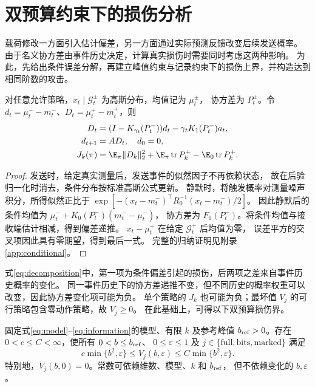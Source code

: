 \section{双预算约束下的损伤分析}
\label{sec:bounds}
载荷修改一方面引入估计偏差，另一方面通过实际预测反馈改变后续发送概率。
由于名义协方差由事件历史决定，计算真实损伤时需要同时考虑这两种影响。
为此，先给出条件误差分解，再建立峰值约束与记录约束下的损伤上界，并构造达到相同阶数的攻击。
\begin{lemma}[条件误差分解]
\label{lem:gaussian}
对任意允许策略，$x_t\mid\mathcal G_t^\pm$ 为高斯分布，均值记为 $\mu_t^\pm$，
协方差为 $P_t^\pm$。令 $d_t=\mu_t^--m_t^-$、$D_t=\mu_t^+-m_t^+$，则
\begin{equation}
 \begin{aligned}
 D_t&=(I-K_{\gamma_t}(P_t^-))d_t-\gamma_t K_1(P_t^-)a_t,\\
 d_{t+1}&=AD_t,\quad d_0=0,\\
 J_k(\pi)&=\E_\pi\|D_k\|_2^2+
 \E_\pi\operatorname{tr}P_k^+-\E_0\operatorname{tr}P_k^+.
 \end{aligned}
 \label{eq:decomposition}
\end{equation}
\end{lemma}
\begin{proof}
发送时，给定真实测量后，发送事件的似然因子不再依赖状态，
故在后验归一化时消去，条件分布按标准高斯公式更新。
静默时，将触发概率对测量噪声积分，所得似然正比于
$\exp[-(x_t-m_t^-)^\top R_0^{-1}(x_t-m_t^-)/2]$。
因此静默后的条件均值为 $\mu_t^-+K_0(P_t^-)(m_t^--\mu_t^-)$，
协方差为 $F_0(P_t^-)$。将条件均值与接收端估计相减，得到偏差递推。
$x_t-\mu_t^+$ 在给定 $\mathcal G_t^+$ 后均值为零，
误差平方的交叉项因此具有零期望，得到最后一式。
完整的归纳证明见附录\ref{app:conditional}。
\end{proof}

式\eqref{eq:decomposition}中，第一项为条件偏差引起的损伤，后两项之差来自事件历史概率的变化。
同一事件历史下的协方差递推不变，但不同历史的概率权重可以改变，因此协方差变化项可能为负。
单个策略的 $J_k$ 也可能为负；最坏值 $V_j$ 的可行策略包含零动作策略，故 $V_j\ge0$。
在此基础上，可得以下双预算损伤界。

\begin{theorem}[任意固定维数下的最坏损伤界]
\label{thm:main}
固定式\eqref{eq:model}--\eqref{eq:information}的模型、有限 $k$ 及参考峰值
$b_{\rm ref}>0$。存在 $0<c\le C<\infty$，使所有 $0<b\le b_{\rm ref}$、
$0\le\varepsilon\le1$ 及 $j\in\{\mathrm{full},\mathrm{bits},\mathrm{marked}\}$ 满足
\begin{equation}
 c\min\{b^2,\varepsilon\}\le V_j(b,\varepsilon)
 \le C\min\{b^2,\varepsilon\}.
 \label{eq:main}
\end{equation}
特别地，$V_j(b,0)=0$。常数可依赖维数、模型、$k$ 和 $b_{\rm ref}$，
但不依赖变化的 $b,\varepsilon$。
\end{theorem}

